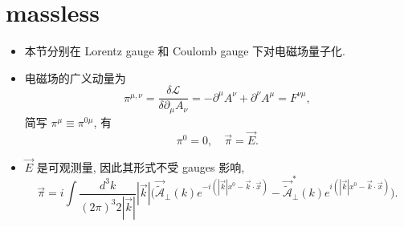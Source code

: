 \section{massless}
\begin{itemize}
	\item 本节分别在 Lorentz gauge 和 Coulomb gauge 下对电磁场量子化.
	
	\item 电磁场的广义动量为
	\begin{equation}
		\pi^{\mu, \nu} = \frac{\delta \mathcal{L}}{\delta \partial_\mu A_\nu} = - \partial^\mu A^\nu + \partial^\nu A^\mu = F^{\nu \mu},
	\end{equation}
	简写 $\pi^\mu \equiv \pi^{0 \mu}$, 有
	\begin{equation}
		\pi^0 = 0, \quad \vec{\pi} = \vec{E}.
	\end{equation}
	
	\item $\vec{E}$ 是可观测量, 因此其形式不受 gauges 影响,
	\begin{equation}
		\vec{\pi} = i \int \frac{d^3 k}{(2 \pi)^3 2 |\vec{k}|} |\vec{k}| \Big( \vec{\tilde{\mathcal{A}}}_\perp(k) e^{- i (|\vec{k}| x^0 - \vec{k} \cdot \vec{x})} - \vec{\tilde{\mathcal{A}}}^*_\perp(k) e^{i (|\vec{k}| x^0 - \vec{k} \cdot \vec{x})} \Big).
	\end{equation}
\end{itemize}

